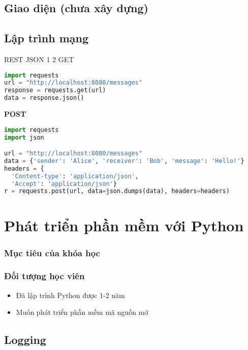 \section{Giao diện (chưa xây dựng)}

\section{Lập trình mạng}


REST
JSON 1 2
GET

\begin{lstlisting}[language=Python]
import requests
url = "http://localhost:8080/messages"
response = requests.get(url)
data = response.json()
\end{lstlisting}

\textbf{POST}

\begin{lstlisting}[language=Python]
import requests
import json

url = "http://localhost:8080/messages"
data = {'sender': 'Alice', 'receiver': 'Bob', 'message': 'Hello!'}
headers = {
  'Content-type': 'application/json',
  'Accept': 'application/json'}
r = requests.post(url, data=json.dumps(data), headers=headers)
\end{lstlisting}

\chapter{Phát triển phần mềm với Python}

\subsection{Mục tiêu của khóa học}

\subsection{Đối tượng học viên}

\begin{itemize}
  \item Đã lập trình Python được 1-2 năm
  \item Muốn phát triển phần mềm mã nguồn mở
\end{itemize}

\section{Logging}

